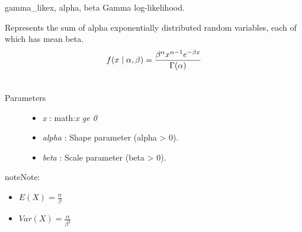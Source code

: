 \hypertarget{pymc.distributions.gamma_like}{}\begin{funcdesc}{gamma\_like}{x, alpha, beta}
Gamma log-likelihood.

Represents the sum of alpha exponentially distributed random variables, each
of which has mean beta.
\begin{gather}
\begin{split}f(x \mid \alpha, \beta) = \frac{\beta^{\alpha}x^{\alpha-1}e^{-\beta x}}{\Gamma(\alpha)}\end{split}\notag\\\begin{split}\end{split}\notag
\end{gather}\begin{description}
\item[Parameters] \leavevmode\begin{itemize}
\item {}
\emph{x} : math:\emph{x ge 0}

\item {}
\emph{alpha} : Shape parameter (alpha \textgreater{} 0).

\item {}
\emph{beta} : Scale parameter (beta \textgreater{} 0).

\end{itemize}

\end{description}

\begin{notice}{note}{Note:}\begin{itemize}
\item {}
$E(X) = \frac{\alpha}{\beta}$

\item {}
$Var(X) = \frac{\alpha}{\beta^2}$

\end{itemize}
\end{notice}
\end{funcdesc}

